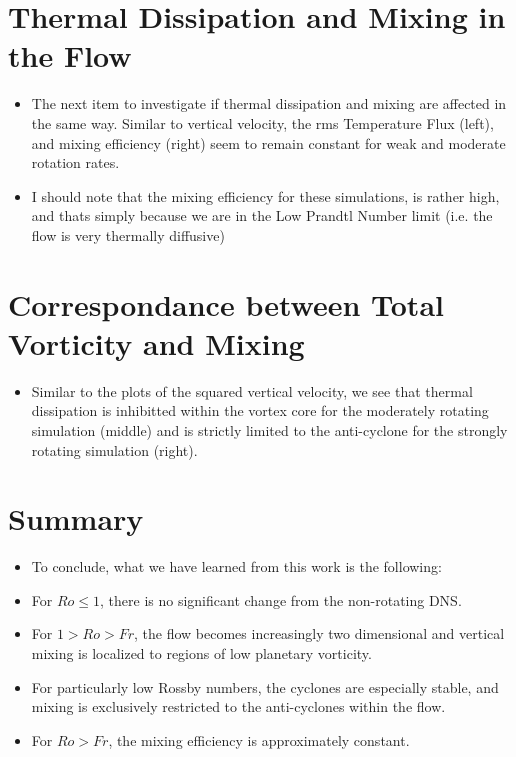 \documentclass{article}
\begin{document}
\section{Thermal Dissipation and Mixing in the Flow}
\begin{itemize}
    \item The next item to investigate if thermal dissipation and mixing are
    affected in the same way. 
    Similar to vertical velocity, the rms Temperature Flux (left), and mixing
    efficiency (right) seem to remain constant for weak and moderate rotation rates. 
    \item I should note that the mixing efficiency for these simulations,
    is rather high, and thats simply because we are in the Low Prandtl Number
    limit (i.e. the flow is very thermally diffusive)
\end{itemize}

\section{Correspondance between Total Vorticity and Mixing}
\begin{itemize}
    \item Similar to the plots of the squared vertical velocity, we see that
    thermal dissipation is inhibitted within the vortex core for the
    moderately rotating simulation (middle) and is strictly limited to the
    anti-cyclone for the strongly rotating simulation (right). 
\end{itemize}

\section{Summary}
\begin{itemize}
    \item To conclude, what we have learned from this work is the following:
    \item For $Ro \le 1$, there is no significant change from the non-rotating
    DNS. 
    \item For $1 > Ro > Fr$, the flow becomes increasingly two dimensional and
    vertical mixing is localized to regions of low planetary vorticity. 
    \item For particularly low Rossby numbers, the cyclones are especially
    stable, and mixing is exclusively restricted to the anti-cyclones
    within the flow. 
    \item For $Ro > Fr$, the mixing efficiency is approximately constant. 
\end{itemize}
\end{document}
